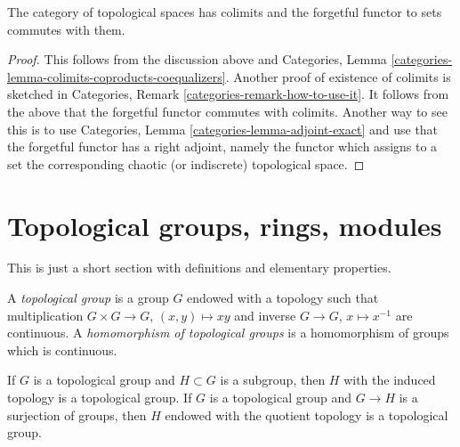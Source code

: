 \begin{lemma}
\label{lemma-colimits}
The category of topological spaces has colimits and the forgetful functor
to sets commutes with them.
\end{lemma}

\begin{proof}
This follows from the discussion above and
Categories, Lemma \ref{categories-lemma-colimits-coproducts-coequalizers}.
Another proof of existence of colimits is sketched in
Categories, Remark \ref{categories-remark-how-to-use-it}.
It follows from the above that the forgetful functor
commutes with colimits. Another way to see this is to use
Categories, Lemma \ref{categories-lemma-adjoint-exact} and use that
the forgetful functor has a right adjoint, namely the functor which
assigns to a set the corresponding chaotic (or indiscrete) topological space.
\end{proof}





\section{Topological groups, rings, modules}
\label{section-topological-groups}

\noindent
This is just a short section with definitions and elementary properties.

\begin{definition}
\label{definition-topological-group}
A {\it topological group} is a group $G$ endowed with a topology
such that multiplication $G \times G \to G$, $(x, y) \mapsto xy$ and
inverse $G \to G$, $x \mapsto x^{-1}$ are continuous.
A {\it homomorphism of topological groups} is a homomorphism of groups
which is continuous.
\end{definition}

\noindent
If $G$ is a topological group and $H \subset G$ is a subgroup,
then $H$ with the induced topology is a topological group.
If $G$ is a topological group and $G \to H$ is a surjection of
groups, then $H$ endowed with the quotient topology is a topological
group.

